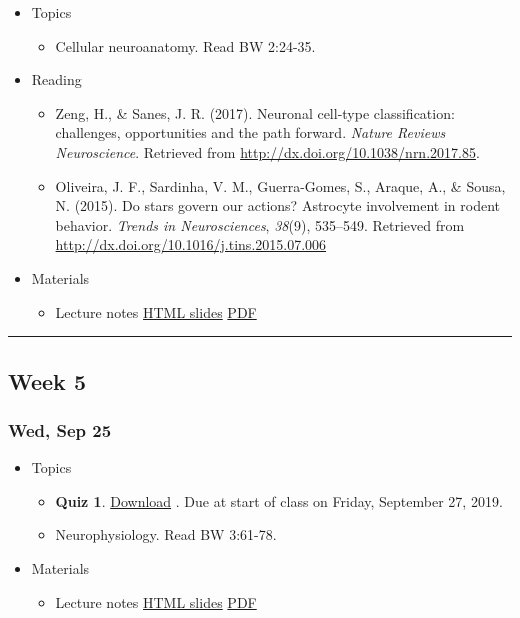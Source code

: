\documentclass[]{article}
\providecommand{\tightlist}{%
  \setlength{\itemsep}{0pt}\setlength{\parskip}{0pt}}
\begin{document}
\begin{itemize}
\tightlist
\item
  Topics

  \begin{itemize}
  \tightlist
  \item
    Cellular neuroanatomy. Read BW 2:24-35.
  \end{itemize}
\item
  Reading

  \begin{itemize}
  \tightlist
  \item
    Zeng, H., \& Sanes, J. R. (2017). Neuronal cell-type classification:
    challenges, opportunities and the path forward. \emph{Nature Reviews
    Neuroscience}. Retrieved from
    \url{http://dx.doi.org/10.1038/nrn.2017.85}.
  \item
    Oliveira, J. F., Sardinha, V. M., Guerra-Gomes, S., Araque, A., \&
    Sousa, N. (2015). Do stars govern our actions? Astrocyte involvement
    in rodent behavior. \emph{Trends in Neurosciences}, \emph{38}(9),
    535--549. Retrieved from
    \url{http://dx.doi.org/10.1016/j.tins.2015.07.006}
  \end{itemize}
\item
  Materials

  \begin{itemize}
  \tightlist
  \item
    Lecture notes \textbar{} \href{}{HTML slides} \textbar{}
    \href{}{PDF}
  \end{itemize}
\end{itemize}

\begin{center}\rule{0.5\linewidth}{\linethickness}\end{center}

\hypertarget{week-5}{%
\subsection{Week 5}\label{week-5}}

\hypertarget{wed-sep-25}{%
\subsubsection{Wed, Sep 25}\label{wed-sep-25}}

\begin{itemize}
\tightlist
\item
  Topics

  \begin{itemize}
  \tightlist
  \item
    \textbf{Quiz 1}. \textbar{} \href{}{Download} \textbar{}. Due at
    start of class on Friday, September 27, 2019.
  \item
    Neurophysiology. Read BW 3:61-78.
  \end{itemize}
\item
  Materials

  \begin{itemize}
  \tightlist
  \item
    Lecture notes \textbar{} \href{}{HTML slides} \textbar{}
    \href{}{PDF}
  \end{itemize}
\end{itemize}
\end{document}
